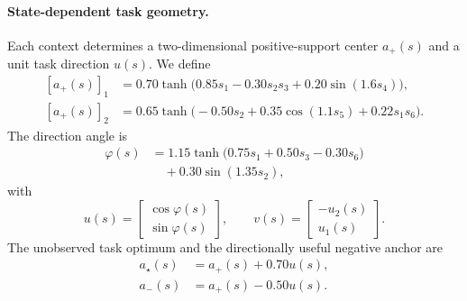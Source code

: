 \documentclass[sigconf,anonymous,review]{acmart}
\theoremstyle{acmdefinition}
\begin{document}
\paragraph{State-dependent task geometry.}
Each context determines a two-dimensional positive-support center
$a_+(s)$ and a unit task direction $u(s)$. We define
\begin{equation}
\begin{aligned}
    [a_+(s)]_1
    &=
    0.70
    \tanh
    \bigl(
        0.85s_1
        -
        0.30s_2s_3
        +
        0.20\sin(1.6s_4)
    \bigr), \\
    [a_+(s)]_2
    &=
    0.65
    \tanh
    \bigl(
        -0.50s_2
        +
        0.35\cos(1.1s_5)
        +
        0.22s_1s_6
    \bigr).
\end{aligned}
\label{eq:cu1_positive_center}
\end{equation}
The direction angle is
\begin{equation}
\begin{aligned}
    \varphi(s)
    &=
    1.15
    \tanh
    \bigl(
        0.75s_1
        +
        0.50s_3
        -
        0.30s_6
    \bigr) \\
    &\quad+
    0.30\sin(1.35s_2),
\end{aligned}
\label{eq:cu1_direction_angle}
\end{equation}
with
\begin{equation}
    u(s)
    =
    \begin{bmatrix}
        \cos\varphi(s)\\
        \sin\varphi(s)
    \end{bmatrix},
    \qquad
    v(s)
    =
    \begin{bmatrix}
        -u_2(s)\\
        u_1(s)
    \end{bmatrix}.
    \label{eq:cu1_task_basis}
\end{equation}
The unobserved task optimum and the directionally useful negative anchor
are
\begin{equation}
\begin{aligned}
    a_\star(s)
    &=
    a_+(s)+0.70u(s), \\
    a_-(s)
    &=
    a_+(s)-0.50u(s).
\end{aligned}
\label{eq:cu1_task_points}
\end{equation}
\end{document}
